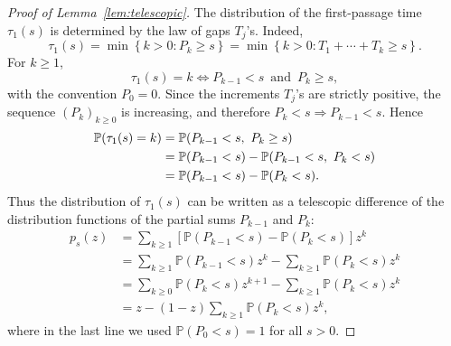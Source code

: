 \documentclass[a4paper,reqno,11pt]{amsart}
\numberwithin{equation}{section}
\def\PR{\mathbb{P}}
\def\PP{{\mathbb P}}
\numberwithin{thm}{section}
\theoremstyle{plain}
\theoremstyle{definition}
\begin{document}
{\begin{proof}[Proof of Lemma~\ref{lem:telescopic}]
    The distribution of the first-passage time $\tau_1(s)$ is determined by the
law of gaps $T_j$'s. Indeed,
\begin{equation}
    \tau_1(s)
    =\min\left\{k>0: P_k\geq s\right\}
    =\min\left\{k>0: T_1+\cdots+T_k\geq s\right\}.
\end{equation}
For $k\geq1$, 
\begin{equation}
   \tau_1(s)=k \iff P_{k-1}<s \, \text{ and }\,   P_k\geq s,
\end{equation}
with the convention $P_0=0$. Since the increments $T_j$'s are strictly positive, the sequence $(P_k)_{k\geq0}$ is increasing, and therefore
$P_k<s \Rightarrow P_{k-1}<s$. Hence
\begin{align}
  \PR(\tau_1(s)=k)
  &= \PR(P_{k-1}<s,\ P_k\ge s) \notag\\
  &= \PR(P_{k-1}<s)-\PR(P_{k-1}<s,\ P_k<s) \notag\\
  &= \PR(P_{k-1}<s)-\PR(P_k<s).
  \label{eq:PL_proof}
\end{align}
Thus the distribution of $\tau_1(s)$ can be written as a
telescopic difference of the distribution functions of the partial sums
$P_{k-1}$ and $P_k$:
\begin{equation}
\begin{aligned}
    p_s(z)
    &=\sum_{k\geq1}
    \left[\PR(P_{k-1}<s)-\PR(P_k<s)\right]z^k\\
      &=\sum_{k\geq1}\PR(P_{k-1}< s)z^{k}-\sum_{k\geq1}\PR(P_{k}< s)z^{k}\\
    &=\sum_{k\geq0}\PR(P_{k}< s)z^{k+1}-\sum_{k\geq1}\PR(P_{k}< s)z^{k}\\
      &=z-(1-z)\sum_{k\geq1}\PR(P_{k}< s)z^{k},
    \label{eq:pgf-telescopic_proof}
    \end{aligned}
\end{equation}
where in the last line we used $\PP(P_{0}< s)=1$ for all $s>0$.


\end{proof}}
\end{document}
